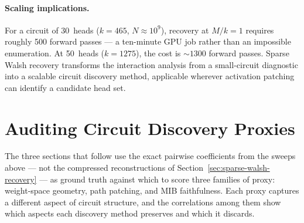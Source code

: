 \documentclass{article}
\begin{document}
\paragraph{Scaling implications.}

For a circuit of 30~heads ($k = 465$, $N \approx 10^9$), recovery at
$M/k = 1$ requires roughly 500 forward passes --- a ten-minute GPU job
rather than an impossible enumeration. At 50~heads ($k = 1275$), the
cost is ${\sim}1300$ forward passes. Sparse Walsh recovery transforms
the interaction analysis from a small-circuit diagnostic into a scalable
circuit discovery method, applicable wherever activation patching can
identify a candidate head set.


%
%


\section{Auditing Circuit Discovery Proxies}
\label{sec:auditing}

The three sections that follow use the exact pairwise coefficients from the sweeps above --- not the compressed reconstructions of
Section~\ref{sec:sparse-walsh-recovery} --- as ground truth against which to score three
families of proxy: weight-space geometry, path patching, and MIB faithfulness. Each
proxy captures a different aspect of circuit structure, and the correlations among them
show which aspects each discovery method preserves and which it discards.


%
%
\end{document}
